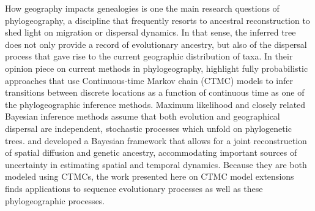 How geography impacts genealogies is one the main research questions of phylogeography, a discipline that frequently resorts to ancestral reconstruction to shed light on migration or dispersal dynamics. 
In that sense, the inferred tree does not only provide a record of evolutionary ancestry, but also of the dispersal process that gave rise to the current geographic distribution of taxa.
%
%
%
In their opinion piece on current methods in phylogeography, \cite{Bloomquist2010} highlight fully probabilistic approaches that use Continuous-time Markov chain (CTMC) models to infer transitions between discrete locations as a function of continuous time as one of the phylogeographic inference methods.
Maximum likelihood and closely related Bayesian inference methods assume that both evolution and geographical dispersal are independent, stochastic processes which unfold on phylogenetic trees.
\cite{Lemey2009} and \cite{Lemey2010} developed a Bayesian framework that allows for a joint reconstruction of spatial diffusion and genetic ancestry, accommodating important sources of uncertainty in estimating spatial and temporal dynamics.
Because they are both modeled using CTMCs, the work presented here on CTMC model extensions finds applications to sequence evolutionary processes as well as these phylogeographic processes.


